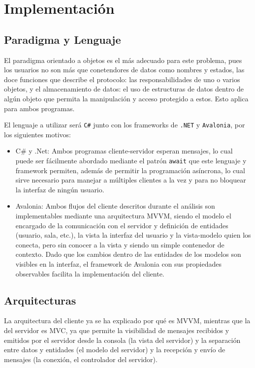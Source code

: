 \chapter{Implementación}

\section{Paradigma y Lenguaje}

El paradigma orientado a objetos es el más adecuado para este problema, pues los usuarios no son más que conetendores de datos como nombres y estados, las doce funciones que describe el protocolo: las responsabilidades de uno o varios objetos, y el almacenamiento de datos: el uso de estructuras de datos dentro de algún objeto que permita la manipulación y acceso protegido a estos. Esto aplica para ambos programas.

El lenguaje a utilizar será \texttt{C\#} junto con los frameworks de \texttt{.NET} y \texttt{Avalonia}, por los siguientes motivos:
\begin{itemize}
	\item C\# y .Net: Ambos programas cliente-servidor esperan mensajes, lo cual puede ser fácilmente abordado mediante el patrón \texttt{await} que este lenguaje y framework permiten, además de permitir la programación asíncrona, lo cual sirve necesario para manejar a múltiples clientes a la vez y para no bloquear la interfaz de ningún usuario.
	\item Avalonia: Ambos flujos del cliente descritos durante el análisis son implementables mediante una arquitectura MVVM, siendo el modelo el encargado de la comunicación con el servidor y definición de entidades (usuario, sala, etc.), la vista la interfaz del usuario y la vista-modelo quien los conecta, pero sin conocer a la vista y siendo un simple contenedor de contexto. Dado que los cambios dentro de las entidades de los modelos son visibles en la interfaz, el framework de Avalonia con sus propiedades observables facilita la implementación del cliente.
\end{itemize}

\section{Arquitecturas}

La arquitectura del cliente ya se ha explicado por qué es MVVM, mientras que la del servidor es MVC, ya que permite la visibilidad de mensajes recibidos y emitidos por el servidor desde la consola (la vista del servidor) y la separación entre datos y entidades (el modelo del servidor) y la recepción y envío de mensajes (la conexión, el controlador del servidor).

